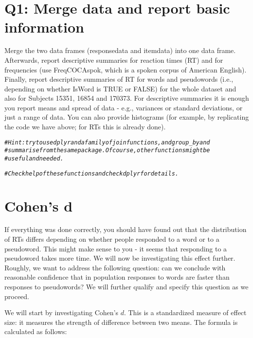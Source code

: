 \documentclass{article}\usepackage[]{graphicx}\usepackage[]{color}
\makeatletter
\newcommand{\hlcom}[1]{\textcolor[rgb]{0.678,0.584,0.686}{\textit{#1}}}%
\newenvironment{kframe}{%
 \def\at@end@of@kframe{}%
 \ifinner\ifhmode%
  \def\at@end@of@kframe{\end{minipage}}%
  \begin{minipage}{\columnwidth}%
 \fi\fi%
 \def\FrameCommand##1{\hskip\@totalleftmargin \hskip-\fboxsep
 \colorbox{shadecolor}{##1}\hskip-\fboxsep
     \hskip-\linewidth \hskip-\@totalleftmargin \hskip\columnwidth}%
 \MakeFramed {\advance\hsize-\width
   \@totalleftmargin\z@ \linewidth\hsize
   \@setminipage}}%
 {\par\unskip\endMakeFramed%
 \at@end@of@kframe}
\newenvironment{knitrout}{}{} %
\makeatother
\begin{document}
\section*{Q1: Merge data and report basic information}

Merge the two data frames (responsedata and itemdata) into one data frame. Afterwards, report descriptive summaries for reaction times (RT) and for frequencies (use FreqCOCAspok, which is a spoken corpus of American English). Finally, report descriptive summaries of RT for words and pseudowords (i.e., depending on whether IsWord is TRUE or FALSE) for the whole dataset and also for Subjects 15351, 16854 and 170373. For descriptive summaries it is enough you report means and spread of data - e.g., variances or standard deviations, or just a range of data. You can also provide histograms (for example, by replicating the code we have above; for RTs this is already done).

\begin{knitrout}
\color{fgcolor}\begin{kframe}
\begin{alltt}
\hlcom{# Hint: try to use dplyr and a family of join functions, and group_by and}
\hlcom{# summarise from the same package.  Of course, other functions might be}
\hlcom{# useful and needed.}

\hlcom{# Check help of these functions and check dplyr for details.}
\end{alltt}
\end{kframe}
\end{knitrout}

\section{Cohen's d}

If everything was done correctly, you should have found out that the distribution of RTs differs depending on whether people responded to a word or to a pseudoword. This might make sense to you - it seems that responding to a pseudoword takes more time. We will now be investigating this effect further. Roughly, we want to address the following question: can we conclude with reasonable confidence that in population responses to words are faster than responses to pseudowords? We will further qualify and specify this question as we proceed.

We will start by investigating Cohen's $d$. This is a standardized measure of effect size: it measures the strength of difference between two means. The formula is calculated as follows:
\end{document}
